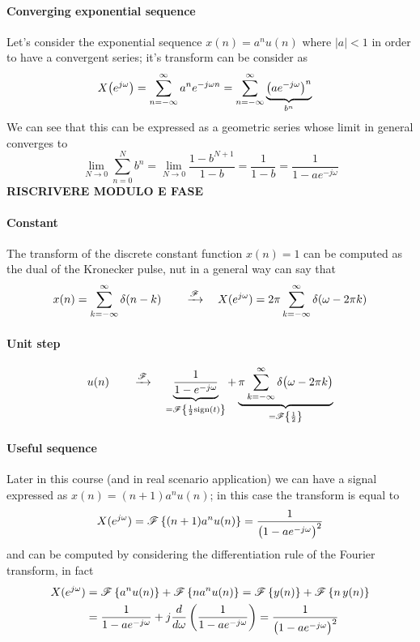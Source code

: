 		\paragraph{Converging exponential sequence} Let's consider the exponential sequence $x(n) = a^n u(n)$ where $|a| < 1$ in order to have a convergent series; it's transform can be consider as
		\begin{align*}
			X\big(e^{j\omega}\big) & = \sum_{n=-\infty}^\infty a^n e^{-j\omega n} = \sum_{n=-\infty}^\infty \underbrace{\left( a e^{-j\omega} \right)^n}_{b^n} 
		\end{align*}
		We can see that this can be expressed as a geometric series whose limit in general converges to
		\[ \lim_{N\rightarrow 0} \sum_{n=0}^N b^n = \lim_{N\rightarrow 0} \frac{1-b^{N+1}}{1-b} = \frac{1}{1-b} = \frac{1}{1-ae^{-j\omega}} \]
		\textbf{RISCRIVERE MODULO E FASE}
		
		\paragraph{Constant} The transform of the discrete constant function $x(n) = 1$ can be computed as the dual of the Kronecker pulse, nut in a general way can say that
		\[ x(n) = \sum_{k=-\infty}^\infty \delta(n-k) \qquad \xrightarrow{\mathscr F} \quad X(e^{j\omega}) = 2\pi \sum_{k=-\infty}^\infty \delta(\omega - 2\pi k) \]
		
		\paragraph{Unit step}
		\[ u(n) \qquad \xrightarrow{\mathscr F} \quad \underbrace{\frac{1 }{1-e^{-j\omega}}}_{=\mathscr{F}\left\{  \frac 1 2 \textrm{sign}(t) \right\}} + \underbrace{\pi \sum_{k=-\infty}^\infty \delta \big(\omega - 2\pi k\big)}_{=\mathscr{F}\left\{ \frac 1 2 \right\}} \]
		
		\paragraph{Useful sequence} Later in this course (and in real scenario application) we can have a signal expressed as $x(n) = (n+1) a^n u(n)$; in this case the transform is equal to 
		\[ X(e^{j\omega}) = \mathscr{F}\left\{ (n+1)a^n u(n) \right\} = \frac{1}{\big(1-ae^{-j\omega} \big)^2} \]
		and can be computed by considering the differentiation rule of the Fourier transform, in fact
		\begin{align*}
			X(e^{j\omega}) & = \mathscr{F}\left\{ a^n u(n) \right\} + \mathscr{F}\left\{ n a^n u(n) \right\} = \mathscr{F}\left\{ y(n) \right\} + \mathscr{F}\left\{ n\, y(n) \right\} \\
			& = \frac{1}{1-a e^{-j\omega}} + j \frac{d}{d\omega} \left(\frac{1}{1-a e^{-j\omega}}\right) = \frac{1}{\big(1-ae^{-j\omega} \big)^2}
		\end{align*}
	
